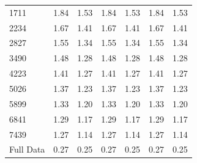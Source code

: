 \begin{table}[!htb]
\begin{tabular}{l||rr|rr|rr}
        1711        &         1.84 &      1.53 &             1.84 &          1.53 &        1.84 &     1.53 \\
        2234        &         1.67 &      1.41 &             1.67 &          1.41 &        1.67 &     1.41 \\
        2827        &         1.55 &      1.34 &             1.55 &          1.34 &        1.55 &     1.34 \\
        3490        &         1.48 &      1.28 &             1.48 &          1.28 &        1.48 &     1.28 \\
        4223        &         1.41 &      1.27 &             1.41 &          1.27 &        1.41 &     1.27 \\
        5026        &         1.37 &      1.23 &             1.37 &          1.23 &        1.37 &     1.23 \\
        5899        &         1.33 &      1.20 &             1.33 &          1.20 &        1.33 &     1.20 \\
        6841        &         1.29 &      1.17 &             1.29 &          1.17 &        1.29 &     1.17 \\
        7439        &         1.27 &      1.14 &             1.27 &          1.14 &        1.27 &     1.14 \\
        Full Data       &         0.27 &      0.25 &             0.27 &          0.25 &        0.27 &     0.25 \\
        \bottomrule
        \end{tabular}
        \end{table}
        
